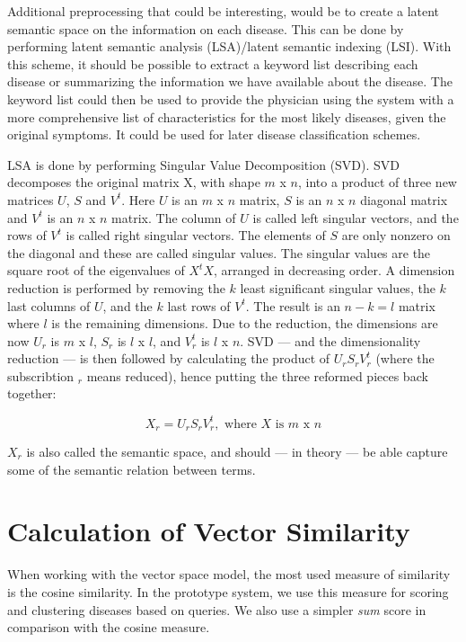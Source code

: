 Additional preprocessing that could be interesting, would be to create a latent
semantic space on the information on each disease. This can be done by
performing latent semantic analysis (LSA)/latent semantic indexing
(LSI). With this scheme, it should be possible to extract a keyword
list describing each disease or summarizing the information we have
available about the disease. The keyword list could then be used to
provide the physician using the system with a more comprehensive list
of characteristics for the most likely diseases, given the original
symptoms. It could be used for later disease classification schemes.

LSA is done by performing Singular Value Decomposition (SVD). SVD
decomposes the original matrix X, with shape $\mathit{m}$ x
$\mathit{n}$, into a product of three new matrices $U$, $S$ and
$V^{t}$. Here $U$ is an $\mathit{m}$ x $\mathit{n}$ matrix, $S$ is an
$\mathit{n}$ x $\mathit{n}$ diagonal matrix and $V^{t}$ is an
$\mathit{n}$ x $\mathit{n}$ matrix. The column of $U$ is called left
singular vectors, and the rows of $V^{t}$ is called right singular
vectors. The elements of $S$ are only nonzero on the diagonal and
these are called singular values. The singular values are the square
root of the eigenvalues of $X^{t}X$, arranged in decreasing order. A
dimension reduction is performed by removing the $k$ least significant
singular values, the $k$ last columns of $U$, and the $k$ last rows of
$V^{t}$. The result is an $n - k = l$ matrix where $l$ is the
remaining dimensions. Due to the reduction, the dimensions are now
$U_{r}$ is $\mathit{m}$ x $\mathit{l}$, $S_{r}$ is $\mathit{l}$ x
$\mathit{l}$, and $V_{r}^{t}$ is $\mathit{l}$ x $\mathit{n}$. SVD ---
and the dimensionality reduction --- is then followed by calculating
the product of $U_{r}S_{r}V_{r}^{t}$ (where the subscribtion $_{r}$
means reduced), hence putting the three reformed pieces back together:

\[
X_{r} = U_{r}S_{r}V_{r}^{t}, \textrm{ where } X \textrm{ is } m \textrm{ x }n
\]

$X_{r}$ is also called the semantic space, and should --- in theory --- be
able capture some of the semantic relation between terms.

\section{Calculation of Vector Similarity\label{VectorSimilarity}}

When working with the vector space model, the most used measure of
similarity is the cosine similarity. In the prototype system, we use
this measure for scoring and clustering diseases based on queries. We
also use a simpler \textit{sum} score in comparison with the cosine
measure.

